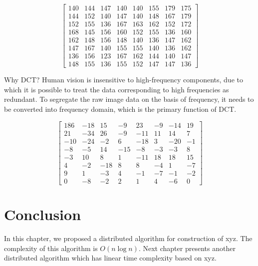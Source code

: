 \begin{equation}
    \begin{bmatrix}
        140 & 144 & 147 & 140 & 140 & 155 & 179 & 175\\ 
        144 & 152 & 140 & 147 & 140 & 148 & 167 & 179\\ 
        152 & 155 & 136 & 167 & 163 & 162 & 152 & 172\\ 
        168 & 145 & 156 & 160 & 152 & 155 & 136 & 160\\ 
        162 & 148 & 156 & 148 & 140 & 136 & 147 & 162\\ 
        147 & 167 & 140 & 155 & 155 & 140 & 136 & 162\\ 
        136 & 156 & 123 & 167 & 162 & 144 & 140 & 147\\ 
        148 & 155 & 136 & 155 & 152 & 147 & 147 & 136
    \end{bmatrix}
    \label{eq:8x8block}   
\end{equation}

Why DCT? Human vision is insensitive to high-frequency components, due to which it is possible to treat the data corresponding to high frequencies as redundant. To segregate the raw image data on the basis of frequency, it needs to be converted into frequency domain, which is the primary function of DCT.

\begin{equation}
    \begin{bmatrix}
        186 & -18 & 15 & -9 & 23 & -9 & -14 & 19\\ 
        21 & -34 & 26 & -9 & -11 & 11 & 14 & 7\\ 
        -10 & -24 & -2 & 6 & -18 & 3 & -20 & -1\\ 
        -8 & -5 & 14 & -15 & -8 & -3 & -3 & 8\\ 
        -3 & 10 & 8 & 1 & -11 & 18 & 18 & 15\\ 
        4 & -2 & -18 & 8 & 8 & -4 & 1 & -7\\ 
        9 & 1 & -3 & 4 & -1 & -7 & -1 & -2\\ 
        0 & -8 & -2 & 2 & 1 & 4 & -6 & 0
    \end{bmatrix}
    \label{eq:DCTTransform}
\end{equation}

\section{Conclusion}
In this chapter, we proposed a distributed algorithm
for construction of xyz.
The complexity of this algorithm is $O(n \log n)$.
Next chapter presents
another distributed algorithm which has linear time 
complexity based on xyz.

